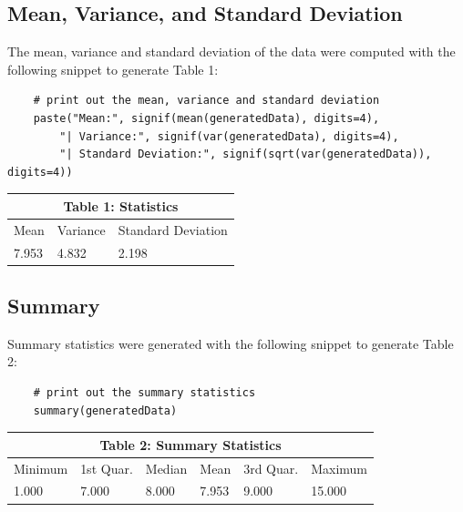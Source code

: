 \documentclass{article}
\begin{document}
        \subsection{Mean, Variance, and Standard Deviation}
            The mean, variance and standard deviation of the data were computed with the following snippet to generate Table 1:
\begin{lstlisting}
    # print out the mean, variance and standard deviation
    paste("Mean:", signif(mean(generatedData), digits=4),
        "| Variance:", signif(var(generatedData), digits=4),
        "| Standard Deviation:", signif(sqrt(var(generatedData)), digits=4))
\end{lstlisting}

        \renewcommand{\arraystretch}{1.5}
        \setlength{\tabcolsep}{18pt}
        \begin{table}[h!]
            \centering
            \begin{tabular}{|p{3cm}|p{3cm}|p{3cm}|}
                 \hline
                 \multicolumn{3}{|c|}{Table 1: Statistics} \\
                 \hline
                 Mean & Variance & Standard Deviation\\
                 \hline
                 7.953 & 4.832 & 2.198\\
                 \hline
            \end{tabular}
        \end{table}

        \subsection{Summary}
            Summary statistics were generated with the following snippet to generate Table 2:
\begin{lstlisting}
    # print out the summary statistics
    summary(generatedData)
\end{lstlisting}

        \begin{table}[h!]
            \centering
            \begin{tabular}{|p{1.5cm}|p{1.5cm}|p{1.5cm}|p{1.5cm}|p{1.5cm}|p{1.5cm}|}
                 \hline
                 \multicolumn{6}{|c|}{Table 2: Summary Statistics} \\
                 \hline
                   Minimum & 1st Quar. &  Median & Mean & 3rd Quar. & Maximum \\
                 \hline
                 1.000 & 7.000 & 8.000 & 7.953 & 9.000 & 15.000\\
                 \hline
            \end{tabular}
        \end{table}
\end{document}
